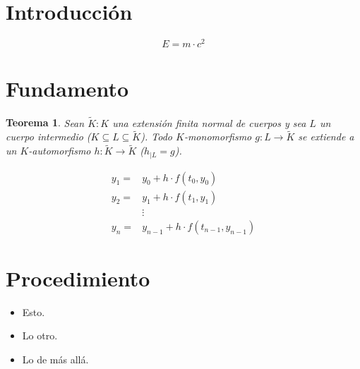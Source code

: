 \documentclass[titlepage,a4paper]{article}
\newtheorem{thm}{Teorema}
\theoremstyle{definition}
\theoremstyle{remark}
\begin{document}
   
  \tableofcontents{}
  \newpage{} %
	
\section{Introducción}

\lipsum[1-1] %

\begin{equation}
E=m \cdot c^2
\end{equation}

\section{Fundamento}

\lipsum[2-2]

\begin{thm}
Sean $\tilde{K}:K$ una extensión finita normal de cuerpos y sea $L$ un cuerpo intermedio ($K\subseteq L\subseteq \tilde{K}$). Todo $K$-monomorfismo $g:L\longrightarrow \tilde{K}$ se extiende a un $K$-automorfismo $h:\tilde{K}\longrightarrow\tilde{K}$ ($h_{\mid L}=g$).
\end{thm}

\lipsum[3-3]

\begin{equation}
\begin{split}
y_{1}=&y_{0}+h\cdot f(t_{0},y_{0}) \\
y_{2}=&y_{1}+h\cdot f(t_{1},y_{1}) \\
	  &\vdots \\
y_{n}=&y_{n-1}+h\cdot f(t_{n-1},y_{n-1})
\end{split}
\end{equation}

\section{Procedimiento}

\lipsum[4-4]

\begin{itemize}
\item Esto.
\item Lo otro.
\item Lo de más allá.
\end{itemize}
\end{document}
